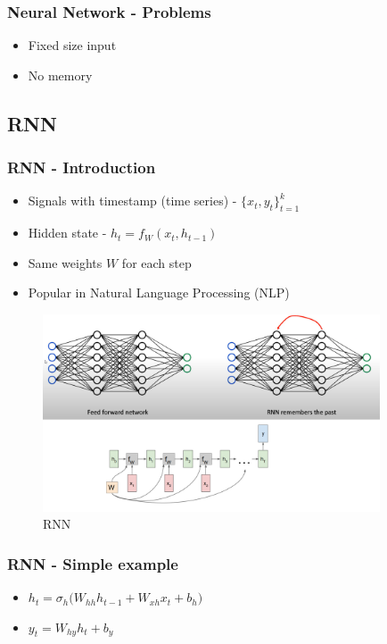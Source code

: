\documentclass{article}
\begin{document}
\subsubsection{Neural Network - Problems}


\begin{itemize}
	\item Fixed size input
	\item No memory
\end{itemize}


\newpage
\subsection{RNN}

\subsubsection{RNN - Introduction}
\begin{itemize}
	\item Signals with timestamp (time series) - $\{x_t, y_t \}_{t=1}^k$
	\item Hidden state - $h_t = f_{W}(x_t, h_{t-1})$
	\item Same weights $W$ for each step
	\item Popular in Natural Language Processing (NLP)
\end{itemize}
\begin{figure}[H]\centering\includegraphics[width=10cm]{RNN.png}\caption{RNN}\end{figure}


\subsubsection{RNN - Simple example}

\begin{itemize}
	\item $h_t = \sigma_h \big(W_{hh} h_{t-1} +  W_{xh} x_{t} + b_h\big)$
	\item $y_t  = W_{hy} h_{t} +  b_y$
\end{itemize}
\end{document}
